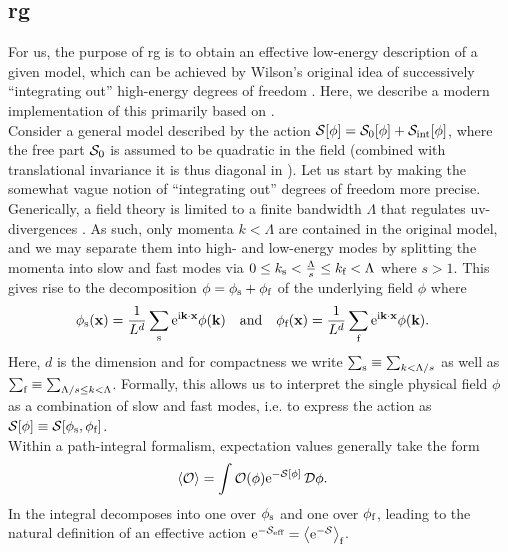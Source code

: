 \subsection{\tMs{} \texorpdfstring{\acrlong{rg}}{RG}}\label{sec:rg:momentum_shell_rg}
For us, the purpose of \gls{rg} is to obtain an effective low-energy description of a given model, which can be achieved by Wilson's original idea of successively ``integrating out'' high-energy degrees of freedom \cite{Bosonization_Shankar_1994,RG_NonPerturbative_Introduction_Delamotte_2012}.
Here, we describe a modern implementation of this primarily based on \cites[]{AltlandSimons}[]{Fradkin_2013}.\\
Consider a general model described by the action $\sact[\phi] = \sact_0[\phi] + \sact_\tint[\phi]$, where the free part $\sact_0$ is assumed to be quadratic in the field (combined with translational invariance it is thus diagonal in \tpspace{}).
Let us start by making the somewhat vague notion of ``integrating out'' degrees of freedom more precise.
Generically, a field theory is limited to a finite bandwidth $\Lambda$ that regulates \gls{uv}-divergences \cite{QFT_RG_OPE_Collins_1984}. %
As such, only momenta $k<\Lambda$ are contained in the original model, and we may separate them into high- and low-energy modes by splitting the momenta into slow and fast modes via $0 \le k_\s < \frac{\Lambda}{s} \le k_\f < \Lambda$ where $s>1$.
This gives rise to the decomposition $\phi = \phi_\s + \phi_\f$ of the underlying field $\phi$ where
\begin{align*}
\phi_\s(\textbf{x}) &= \frac{1}{L^d} \sum_\s \powe{\i \textbf{k}\cdot \textbf{x}} \phi(\textbf{k}) \quad \text{and} \quad \phi_\f(\textbf{x}) = \frac{1}{L^d} \sum_\f \powe{\i \textbf{k}\cdot \textbf{x}} \phi(\textbf{k}).
\end{align*}
Here, $d$ is the dimension and for compactness we write $\sum_\s \equiv \sum_{k<\Lambda/s}$ as well as $\sum_\f \equiv \sum_{\Lambda/s \le k < \Lambda}$.
Formally, this allows us to interpret the single physical field $\phi$ as a combination of slow and fast modes, i.e. to express the action as $\sact[\phi] \equiv \sact[\phi_\s, \phi_\f]$.\\
Within a path-integral formalism, expectation values generally take the form \cite{AltlandSimons}
\begin{align*}
\bra*{\mathcal{O}} &= \int \mathcal{O(\phi) \powe{-\sact[\phi]}}\,\mathcal{D}\phi.
\end{align*}
In \tpspace{} the integral decomposes into one over $\phi_\s$ and one over $\phi_\f$, leading to the natural definition of an effective action $\powe{-\sact_\eff} = \bra*{\powe{-\sact}}_\f$.
